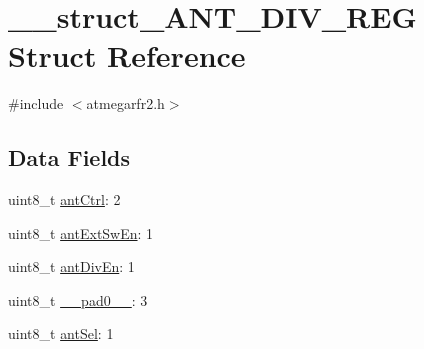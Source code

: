 \hypertarget{struct____struct___a_n_t___d_i_v___r_e_g}{\section{\-\_\-\-\_\-struct\-\_\-\-A\-N\-T\-\_\-\-D\-I\-V\-\_\-\-R\-E\-G Struct Reference}
\label{struct____struct___a_n_t___d_i_v___r_e_g}
}


{\ttfamily \#include $<$atmegarfr2.\-h$>$}

\subsection*{Data Fields}
\begin{DoxyCompactItemize}
\item 
uint8\-\_\-t \hyperlink{struct____struct___a_n_t___d_i_v___r_e_g_a50d29c108af72b952d5e86605166c3ea}{ant\-Ctrl}\-: 2
\item 
uint8\-\_\-t \hyperlink{struct____struct___a_n_t___d_i_v___r_e_g_aefef59b03053d3afe05ebbf2487dfbbc}{ant\-Ext\-Sw\-En}\-: 1
\item 
uint8\-\_\-t \hyperlink{struct____struct___a_n_t___d_i_v___r_e_g_af0d9f7e38d462aece29f502fa450d39f}{ant\-Div\-En}\-: 1
\item 
uint8\-\_\-t \hyperlink{struct____struct___a_n_t___d_i_v___r_e_g_abdca394a320c4e8581e209178ee49439}{\-\_\-\-\_\-pad0\-\_\-\-\_\-}\-: 3
\item 
uint8\-\_\-t \hyperlink{struct____struct___a_n_t___d_i_v___r_e_g_aefef79020a24daed6bc9f8b2d72ab3b6}{ant\-Sel}\-: 1
\end{DoxyCompactItemize}


